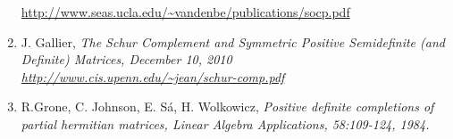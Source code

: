 \documentclass[10pt,oneside]{book}
\theoremstyle{definition}
\begin{document}
\begin{enumerate}
\url{http://www.seas.ucla.edu/~vandenbe/publications/socp.pdf}
\label{LoboVandApplicationsofSOCP}
%
\item J. Gallier, \it The Schur Complement and Symmetric Positive Semidefinite (and Definite) Matrices, \rm December 10, 2010 \\
\url{http://www.cis.upenn.edu/~jean/schur-comp.pdf}
\label{GallierSchurCompl}
%
\item R.Grone, C. Johnson, E. Sá, H. Wolkowicz, \it Positive definite completions of partial hermitian matrices, \rm 
Linear Algebra Applications, 58:109-124, 1984.
\label{GronePSDcompletions}
%
\end{enumerate}
\end{document}
